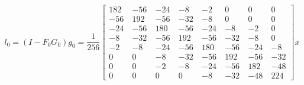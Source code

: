 \begin{equation}
l_{0} =  (I - F_0 G_0) g_0= 
\frac{1}{256}
 \begin{bmatrix}
   182 ~& -56  ~& -24 ~&   -8   ~& -2  ~&   0  ~&   0  ~&   0\\
   -56  ~& 192  ~& -56 ~&  -32   ~& -8   ~&  0  ~&   0   ~&  0\\
   -24  ~& -56  ~& 180  ~& -56 ~&  -24  ~&  -8  ~&  -2   ~&  0\\
    -8   ~&-32  ~& -56  ~& 192  ~& -56  ~& -32  ~&  -8   ~&  0\\
    -2   ~& -8 ~&  -24  ~& -56 ~&  180 ~&  -56  ~& -24 ~&   -8\\
     0   ~&  0  ~&  -8  ~& -32 ~&  -56  ~& 192  ~& -56  ~& -32\\
     0   ~&   0  ~&  -2  ~&  -8  ~& -24  ~& -56 ~&  182  ~& -48\\
     0   ~&   0   ~&  0  ~&   0   ~& -8  ~& -32 ~&  -48 ~&  224
\end{bmatrix}
x
\end{equation}



